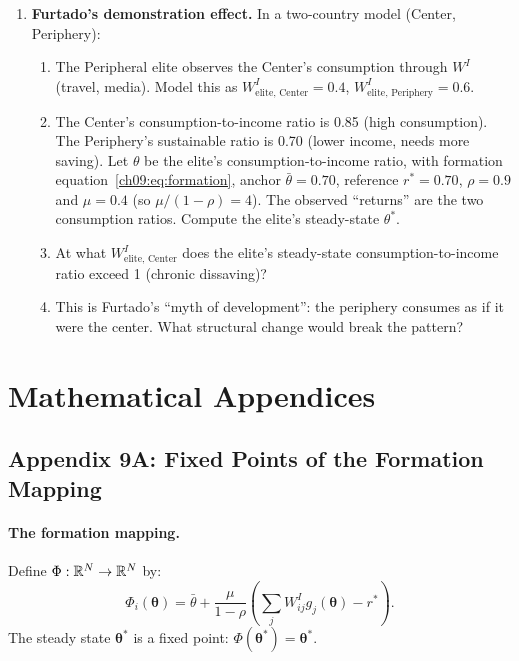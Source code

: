 \documentclass[../structural_economics_book.tex]{subfiles}
\begin{document}
\begin{enumerate}[label=\textbf{9.\arabic*}, leftmargin=3em]
\item \textbf{Furtado's demonstration effect.} In a two-country model (Center, Periphery):
\begin{enumerate}
\item The Peripheral elite observes the Center's consumption through $W^I$ (travel, media). Model this as $W^I_{\text{elite, Center}} = 0.4$, $W^I_{\text{elite, Periphery}} = 0.6$.
\item The Center's consumption-to-income ratio is 0.85 (high consumption). The Periphery's sustainable ratio is 0.70 (lower income, needs more saving). Let $\theta$ be the elite's consumption-to-income ratio, with formation equation~\eqref{ch09:eq:formation}, anchor $\bar{\theta} = 0.70$, reference $r^* = 0.70$, $\rho = 0.9$ and $\mu = 0.4$ (so $\mu/(1-\rho) = 4$). The observed ``returns'' are the two consumption ratios. Compute the elite's steady-state $\theta^*$.
\item At what $W^I_{\text{elite, Center}}$ does the elite's steady-state consumption-to-income ratio exceed 1 (chronic dissaving)?
\item This is Furtado's ``myth of development'': the periphery consumes as if it were the center. What structural change would break the pattern?
\end{enumerate}
\end{enumerate}


\newpage
\section*{Mathematical Appendices}


\subsection*{Appendix 9A: Fixed Points of the Formation Mapping}
\label{ch09:app:fixed}

\paragraph{The formation mapping.} Define $\Phi: \mathbb{R}^N \to \mathbb{R}^N$ by:
\begin{equation}
\Phi_i(\boldsymbol{\theta}) = \bar{\theta} + \frac{\mu}{1-\rho}\left(\sum_j W^I_{ij} g_j(\boldsymbol{\theta}) - r^*\right).
\end{equation}
The steady state $\boldsymbol{\theta}^*$ is a fixed point: $\Phi(\boldsymbol{\theta}^*) = \boldsymbol{\theta}^*$.
\end{document}
